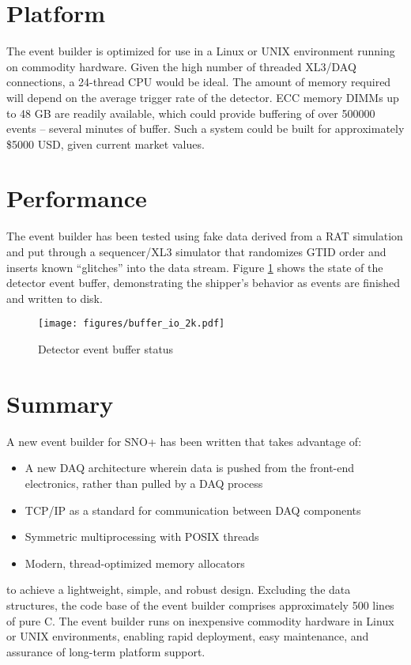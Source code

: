 \documentclass[11pt,twocolumn]{article}
\begin{document}
\section{Platform}
The event builder is optimized for use in a Linux or UNIX environment running on commodity hardware. Given the high number of threaded XL3/DAQ connections, a 24-thread CPU would be ideal. The amount of memory required will depend on the average trigger rate of the detector. ECC memory DIMMs up to 48 GB are readily available, which could provide buffering of over 500000 events -- several minutes of buffer. Such a system could be built for approximately \$5000 USD, given current market values.

\section{Performance}
The event builder has been tested using fake data derived from a RAT simulation and put through a sequencer/XL3 simulator that randomizes GTID order and inserts known ``glitches'' into the data stream. Figure \ref{pointers_2k} shows the state of the detector event buffer, demonstrating the shipper's behavior as events are finished and written to disk.
\begin{figure}[htp]
\centering
\texttt{[image: figures/buffer\_io\_2k.pdf]}
\caption{Detector event buffer status}
\label{pointers_2k}
\end{figure}

\section{Summary}
A new event builder for SNO+ has been written that takes advantage of:
\begin{itemize}
\item A new DAQ architecture wherein data is pushed from the front-end electronics, rather than pulled by a DAQ process
\item TCP/IP as a standard for communication between DAQ components
\item Symmetric multiprocessing with POSIX threads
\item Modern, thread-optimized memory allocators
\end{itemize}

to achieve a lightweight, simple, and robust design. Excluding the data structures, the code base of the event builder comprises approximately 500 lines of pure C. The event builder runs on inexpensive commodity hardware in Linux or UNIX environments, enabling rapid deployment, easy maintenance, and assurance of long-term platform support.
\end{document}
